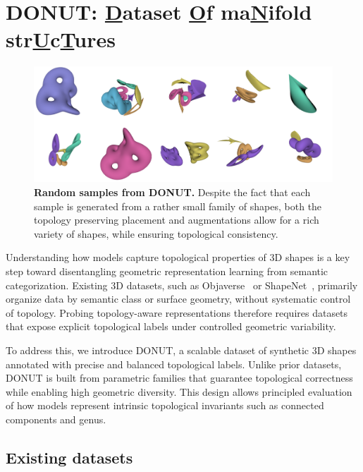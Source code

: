 \section{DONUT: \underline{D}ataset \underline{O}f ma\underline{N}ifold str\underline{U}c\underline{T}ures}
\label{sec:topogen}

\begin{figure}
  \centering
  \includegraphics[width=1.0\linewidth]{figs/topogen/samples_overview.png}

  \label{fig:topogen-samples}
  \caption{\textbf{Random samples from DONUT.} Despite the fact that each sample is generated from a rather small family of shapes, both the topology preserving placement and augmentations allow for a rich variety of shapes, while ensuring topological consistency.}
  \label{fig:short}
\end{figure}


Understanding how models capture topological properties of 3D shapes is a key step toward disentangling geometric representation learning from semantic categorization. Existing 3D datasets, such as Objaverse~\cite{objaverse,objaverse_xl} or ShapeNet~\cite{shapenet}, primarily organize data by semantic class or surface geometry, without systematic control of topology. Probing topology-aware representations therefore requires datasets that expose explicit topological labels under controlled geometric variability.

To address this, we introduce DONUT, a scalable dataset of synthetic 3D shapes annotated with precise and balanced topological labels. Unlike prior datasets, DONUT is built from parametric families that guarantee topological correctness while enabling high geometric diversity. This design allows principled evaluation of how models represent intrinsic topological invariants such as connected components and genus.

\subsection{Existing datasets}
\label{ssec:existing_datasets}

